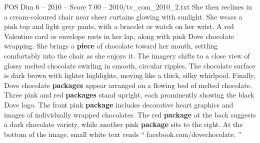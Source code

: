 \begin{textsample}{POS Dim 6 – 2010 – Score 7.00 – 2010/tv\_com\_2010\_2.txt}
She then reclines in a cream-coloured chair near sheer curtains glowing with sunlight.
She wears a pink top and light grey pants, with a bracelet or watch on her wrist.
A red Valentine card or envelope rests in her lap, along with pink Dove chocolate wrapping.
She brings a \textbf{piece} of chocolate toward her mouth, settling comfortably into the chair as she enjoys it.
The imagery shifts to a close view of glossy melted chocolate swirling in smooth, circular ripples.
The chocolate surface is dark brown with lighter highlights, moving like a thick, silky whirlpool.
Finally, Dove chocolate \textbf{packages} appear arranged on a flowing bed of melted chocolate.
Three pink and red \textbf{packages} stand upright, each prominently showing the black Dove logo.
The front pink \textbf{package} includes decorative heart graphics and images of individually wrapped chocolates.
The red \textbf{package} at the back suggests a dark chocolate variety, while another pink \textbf{package} sits to the right.
At the bottom of the image, small white text reads “ facebook.com/dovechocolate. ”

\end{textsample}
